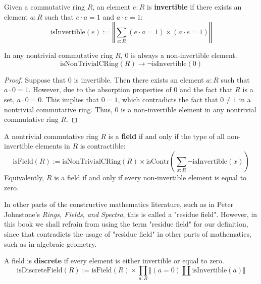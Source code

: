 




\begin{definition}
Given a commutative ring $R$, an element $e:R$ is \textbf{invertible} if there exists an element $a:R$ such that $e \cdot a = 1$ and $a \cdot e = 1$:
$$\mathrm{isInvertible}(e) := \left\Vert\sum_{a:R} (e \cdot a = 1) \times (a \cdot e = 1)\right\Vert$$
\end{definition}

\begin{theorem}
In any nontrivial commutative ring $R$, $0$ is always a non-invertible element. 
$$\mathrm{isNonTrivialCRing}(R) \to \neg \mathrm{isInvertible}(0)$$
\end{theorem}

\begin{proof}
Suppose that $0$ is invertible. Then there exists an element $a:R$ such that $a \cdot 0 = 1$. However, due to the absorption properties of $0$ and the fact that $R$ is a set, $a \cdot 0 = 0$. This implies that $0 = 1$, which contradicts the fact that $0 \neq 1$ in a nontrivial commutative ring. Thus, $0$ is a non-invertible element in any nontrivial commutative ring $R$. 
\end{proof}

\begin{definition}
A nontrivial commutative ring $R$ is a \textbf{field} if and only if the type of all non-invertible elements in $R$ is contractible:
$$\mathrm{isField}(R) := \mathrm{isNonTrivialCRing}(R) \times \mathrm{isContr}\left(\sum_{x:R} \neg \mathrm{isInvertible}(x)\right)$$ 
Equivalently, $R$ is a field if and only if every non-invertible element is equal to zero. 
\end{definition}

\begin{remark}
In other parts of the constructive mathematics literature, such as in Peter Johnstone's \textit{Rings, Fields, and Spectra}, this is called a "residue field". However, in this book we shall refrain from using the term "residue field" for our definition, since that contradicts the usage of "residue field" in other parts of mathematics, such as in algebraic geometry. 
\end{remark}

\begin{definition}
A field is \textbf{discrete} if every element is either invertible or equal to zero. 
$$\mathrm{isDiscreteField}(R) := \mathrm{isField}(R) \times \prod_{a:R} \Vert(a = 0) \amalg \mathrm{isInvertible}(a)\Vert$$ 
\end{definition}

